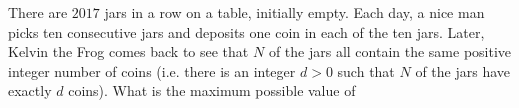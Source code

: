 There are $2017$ jars in a row on a table, initially empty. Each day, a nice man picks ten consecutive jars and deposits one coin in each of the ten jars. Later, Kelvin the Frog comes back to see that $N$ of the jars all contain the same positive integer number of coins (i.e. there is an integer $d>0$ such that $N$ of the jars have exactly $d$ coins). What is the maximum possible value of 